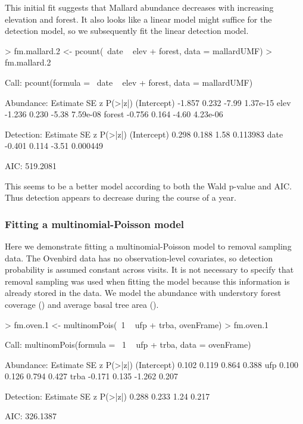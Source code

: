 \documentclass[article,shortnames]{jss}
\begin{document}
This initial fit suggests that Mallard abundance decreases with
increasing elevation and forest.  It also looks like a linear model
might suffice for the detection model, so we subsequently fit the
linear detection model.


\begin{Schunk}
\begin{Sinput}
> fm.mallard.2 <- pcount(~date ~ elev + forest, data = mallardUMF)
> fm.mallard.2
\end{Sinput}
\begin{Soutput}
Call:
pcount(formula = ~date ~ elev + forest, data = mallardUMF)

Abundance:
            Estimate    SE     z  P(>|z|)
(Intercept)   -1.857 0.232 -7.99 1.37e-15
elev          -1.236 0.230 -5.38 7.59e-08
forest        -0.756 0.164 -4.60 4.23e-06

Detection:
            Estimate    SE     z  P(>|z|)
(Intercept)    0.298 0.188  1.58 0.113983
date          -0.401 0.114 -3.51 0.000449

AIC: 519.2081 
\end{Soutput}
\end{Schunk}

This seems to be a better model according to both the Wald p-value and
AIC.  Thus detection appears to decrease during the course of a year.



\subsubsection{Fitting a multinomial-Poisson model}

Here we demonstrate fitting a multinomial-Poisson model to removal sampling 
data.  The Ovenbird data has no observation-level covariates, so detection
probability is assumed constant across visits.  It is not necessary
to specify that removal sampling was used when fitting the model
because this information is already stored in the  data.
We model the abundance with understory forest coverage ()
and average basal tree area ().

\begin{Schunk}
\begin{Sinput}
> fm.oven.1 <- multinomPois(~1 ~ ufp + trba, ovenFrame)
> fm.oven.1
\end{Sinput}
\begin{Soutput}
Call:
multinomPois(formula = ~1 ~ ufp + trba, data = ovenFrame)

Abundance:
            Estimate    SE      z P(>|z|)
(Intercept)    0.102 0.119  0.864   0.388
ufp            0.100 0.126  0.794   0.427
trba          -0.171 0.135 -1.262   0.207

Detection:
 Estimate    SE    z P(>|z|)
    0.288 0.233 1.24   0.217

AIC: 326.1387 
\end{Soutput}
\end{Schunk}
\end{document}
